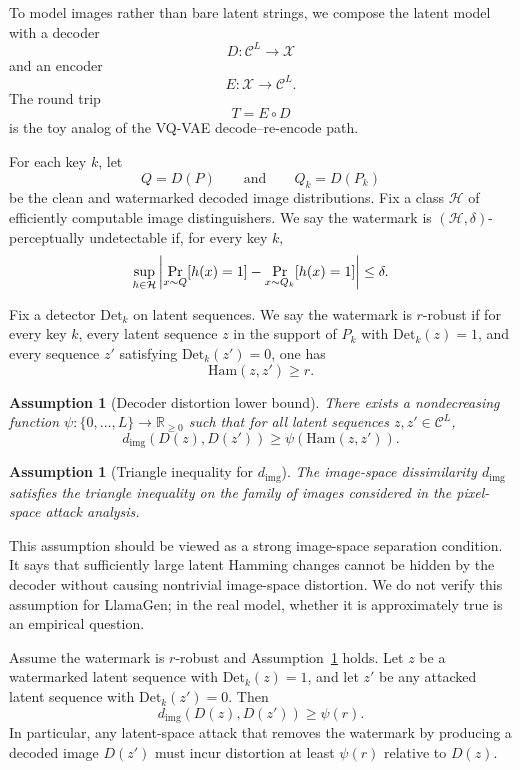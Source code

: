\documentclass[12pt]{article}
\newtheorem{assumption}[theorem]{Assumption}
\newcommand{\cC}{\mathcal{C}}
\newcommand{\cX}{\mathcal{X}}
\newcommand{\Ham}{\mathrm{Ham}}
\begin{document}
To model images rather than bare latent strings, we compose the latent
model with a decoder
\[
D:\cC^L\to \cX
\]
and an encoder
\[
E:\cX\to \cC^L.
\]
The round trip
\[
T=E\circ D
\]
is the toy analog of the VQ-VAE decode--re-encode path.

\begin{definition}
For each key $k$, let
\[
Q=D(P)
\qquad\text{and}\qquad
Q_k=D(P_k)
\]
be the clean and watermarked decoded image distributions. Fix a class
$\mathcal{H}$ of efficiently computable image distinguishers. We say the
watermark is $(\mathcal{H},\delta)$-perceptually undetectable if, for
every key $k$,
\[
\sup_{h\in \mathcal{H}}
\left|
\Prob[x\sim Q]{h(x)=1}-\Prob[x\sim Q_k]{h(x)=1}
\right|
\le \delta.
\]
\end{definition}

\begin{definition}
Fix a detector $\mathrm{Det}_k$ on latent sequences. We say the
watermark is $r$-robust if for every key $k$, every latent sequence
$z$ in the support of $P_k$ with $\mathrm{Det}_k(z)=1$, and every
sequence $z'$ satisfying $\mathrm{Det}_k(z')=0$, one has
\[
\Ham(z,z')\ge r.
\]
\end{definition}

\begin{assumption}[Decoder distortion lower bound]\label{assump:decoder}
There exists a nondecreasing function
$\psi:\{0,\dots,L\}\to \mathbb{R}_{\ge 0}$ such that for all latent
sequences $z,z'\in \cC^L$,
\[
d_{\mathrm{img}}(D(z),D(z'))\ge \psi(\Ham(z,z')).
\]
\end{assumption}

\begin{assumption}[Triangle inequality for $d_{\mathrm{img}}$]
\label{assump:metric}
The image-space dissimilarity $d_{\mathrm{img}}$ satisfies the triangle
inequality on the family of images considered in the pixel-space attack
analysis.
\end{assumption}

This assumption should be viewed as a strong image-space separation
condition. It says that sufficiently large latent Hamming changes cannot
be hidden by the decoder without causing nontrivial image-space
distortion. We do not verify this assumption for LlamaGen; in the real
model, whether it is approximately true is an empirical question.

\begin{theorem}
Assume the watermark is $r$-robust and Assumption~\ref{assump:decoder}
holds. Let $z$ be a watermarked latent sequence with
$\mathrm{Det}_k(z)=1$, and let $z'$ be any attacked latent sequence
with $\mathrm{Det}_k(z')=0$. Then
\[
d_{\mathrm{img}}(D(z),D(z'))\ge \psi(r).
\]
In particular, any latent-space attack that removes the watermark by
producing a decoded image $D(z')$ must incur distortion at least
$\psi(r)$ relative to $D(z)$.
\end{theorem}
\end{document}
